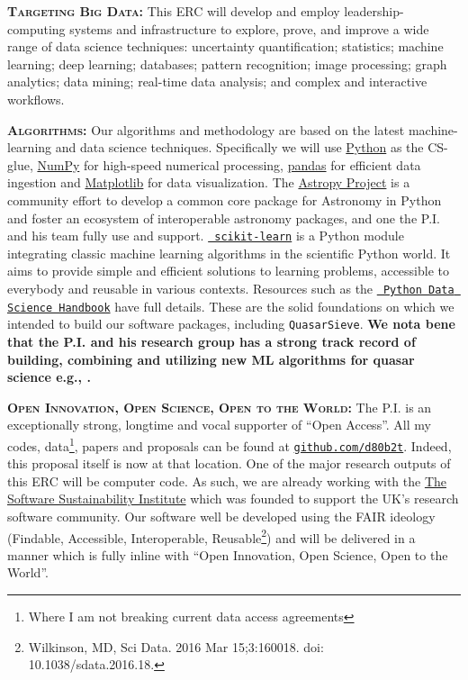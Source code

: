 \smallskip
\smallskip
\noindent
\textbf{\textsc{Targeting Big Data: }}
This ERC will develop and employ leadership-computing systems and
infrastructure to explore, prove, and improve a wide range of data
science techniques: uncertainty quantification; statistics; machine
learning; deep learning; databases; pattern recognition; image
processing; graph analytics; data mining; real-time data analysis; and
complex and interactive workflows.

\smallskip
\smallskip
\noindent
\textbf{\textsc{Algorithms: }}
Our algorithms and methodology are based on the latest
machine-learning and data science techniques. Specifically we will use
\href{https://www.python.org/}{Python} as the CS-glue,
\href{http://www.numpy.org/}{NumPy} for high-speed numerical
processing, \href{https://pandas.pydata.org/}{pandas} for efficient
data ingestion and \href{https://matplotlib.org/}{Matplotlib} for data
visualization.  The \href{http://www.astropy.org/}{Astropy Project} is a
community effort to develop a common core package for Astronomy in
Python and foster an ecosystem of interoperable astronomy packages,
and one the P.I. and his team fully use and support.
\href{http://ogrisel.github.io/scikit-learn.org/sklearn-tutorial/index.html}{\tt
scikit-learn} is a Python module integrating classic machine learning
algorithms in the scientific Python world. It aims to provide simple and efficient solutions to
learning problems, accessible to everybody and reusable in various
contexts. Resources such as the
\href{https://github.com/jakevdp/PythonDataScienceHandbook}{{\tt
Python Data Science Handbook}} have full details. 
These are the solid foundations on which we intended to build our software packages, 
including {\tt QuasarSieve}. 
{\bf We nota bene that the P.I. and his research group has a strong track 
record of building, combining and utilizing new ML algorithms for 
quasar science e.g., \citet{Ross2012}.}




\smallskip
\smallskip
\noindent
\textbf{\textsc{Open Innovation, Open Science, Open to the World:}}
The P.I. is an exceptionally strong, longtime and vocal supporter of
``Open Access''.  All my codes, data\footnote{Where I am not breaking
current data access agreements}, papers and proposals can be found at
\href{github.com/d80b2t}{{\tt github.com/d80b2t}}.  Indeed, this
proposal itself is now at that location.  One of the major research
outputs of this ERC will be computer code.  As such, we are already
working with the \href{\tt https://www.software.ac.uk/}{The Software
Sustainability Institute} which was founded to support the UK's
research software community.  Our software well be developed using the
FAIR ideology (Findable, Accessible, Interoperable,
Reusable\footnote{Wilkinson, MD, Sci Data. 2016 Mar 15;3:160018. doi:
10.1038/sdata.2016.18.})  and will be delivered in a manner which is
fully inline with ``Open Innovation, Open Science, Open to the
World''.

